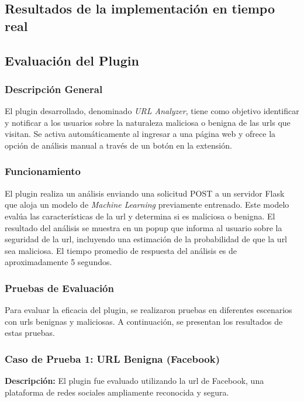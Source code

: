 \subsection{Resultados de la implementación en tiempo real}

\subsection*{Evaluación del Plugin}

\subsubsection*{Descripción General}
El plugin desarrollado, denominado \textit{URL Analyzer}, tiene como objetivo identificar y notificar a los usuarios sobre la naturaleza maliciosa o benigna de las \glspl{url} que visitan. Se activa automáticamente al ingresar a una página web y ofrece la opción de análisis manual a través de un botón en la extensión.

\subsubsection*{Funcionamiento}
El plugin realiza un análisis enviando una solicitud POST a un servidor Flask que aloja un modelo de \textit{Machine Learning} previamente entrenado. Este modelo evalúa las características de la \gls{url} y determina si es maliciosa o benigna. El resultado del análisis se muestra en un popup que informa al usuario sobre la seguridad de la \gls{url}, incluyendo una estimación de la probabilidad de que la \gls{url} sea maliciosa. El tiempo promedio de respuesta del análisis es de aproximadamente 5 segundos.

\subsubsection*{Pruebas de Evaluación}
Para evaluar la eficacia del plugin, se realizaron pruebas en diferentes escenarios con \glspl{url} benignas y maliciosas. A continuación, se presentan los resultados de estas pruebas.

\subsubsection*{Caso de Prueba 1: URL Benigna (Facebook)}
\textbf{Descripción:}
El plugin fue evaluado utilizando la \gls{url} de Facebook, una plataforma de redes sociales ampliamente reconocida y segura.



